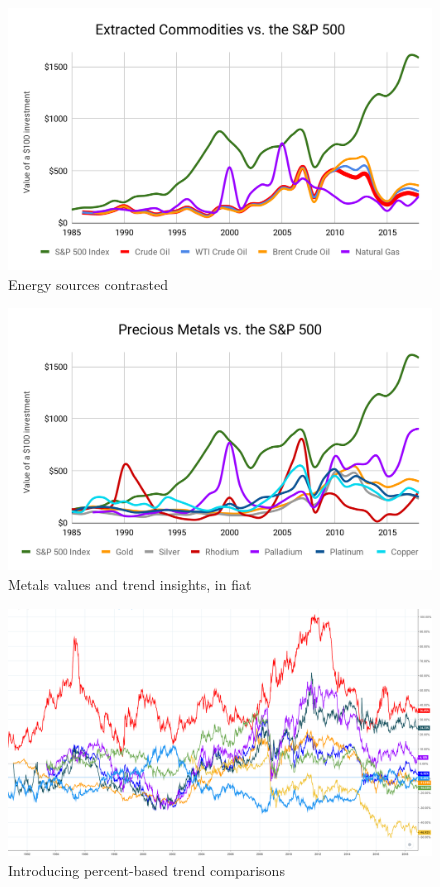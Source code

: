 \documentclass{article}
\begin{document}
\begin{figure}[!htb]
    \centering
    \includegraphics[width=\textwidth]{imgs/19.png}
    \caption{Energy sources contrasted}
\end{figure}

\vspace{10pt}

\begin{figure}[!htb]
    \centering
    \includegraphics[width=\textwidth]{imgs/20.png}
    \caption{Metals values and trend insights, in fiat}
\end{figure}

\vspace{10pt}

\begin{figure}[!htb]
    \centering
    \includegraphics[width=\textwidth]{imgs/21.png}
    \caption{Introducing percent-based trend comparisons}
\end{figure}
\end{document}
